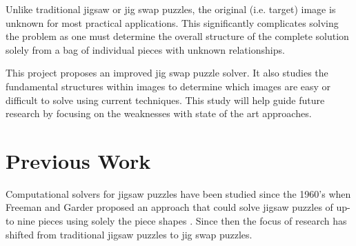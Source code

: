 \documentclass{report}
\begin{document}
Unlike traditional jigsaw or jig swap puzzles, the original (i.e. target) image is unknown for most practical applications.  This significantly complicates solving the problem as one must determine the overall structure of the complete solution solely from a bag of individual pieces with unknown relationships.

This project proposes an improved jig swap puzzle solver.  It also studies the fundamental structures within images to determine which images are easy or difficult to solve using current techniques.  This study will help guide future research by focusing on the weaknesses with state of the art approaches. 

\pagebreak
\section{Previous Work}\label{sec:previousWork}

Computational solvers for jigsaw puzzles have been studied since the 1960's when Freeman and Garder proposed an approach that could solve jigsaw puzzles of up-to nine pieces using solely the piece shapes \cite{freeman1964}.  Since then the focus of research has shifted from traditional jigsaw puzzles to jig swap puzzles.  

\pagebreak


\end{document}
